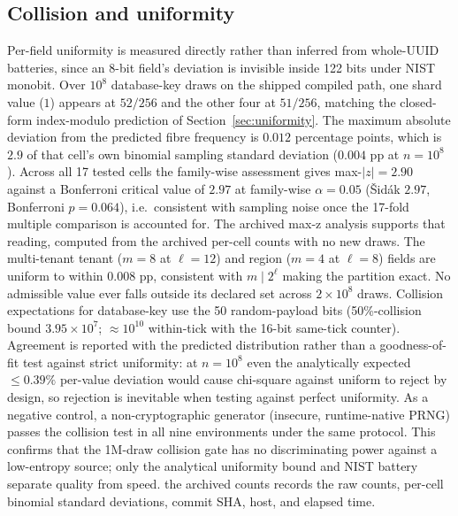 \documentclass{svproc}
\begin{document}
\subsection{Collision and uniformity}
Per-field uniformity is measured directly rather than inferred from whole-UUID batteries, since an 8-bit field's deviation is invisible inside 122 bits under NIST monobit. Over $10^8$ database-key draws on the shipped compiled path, one shard value ($1$) appears at $52/256$ and the other four at $51/256$, matching the closed-form index-modulo prediction of Section~\ref{sec:uniformity}. The maximum absolute deviation from the predicted fibre frequency is $0.012$ percentage points, which is $2.9$ of that cell's own binomial sampling standard deviation ($0.004$ pp at $n=10^8$). Across all 17 tested cells the family-wise assessment gives max-$|z|=2.90$ against a Bonferroni critical value of $2.97$ at family-wise $\alpha=0.05$ (\v{S}id\'ak $2.97$, Bonferroni $p=0.064$), i.e.\ consistent with sampling noise once the 17-fold multiple comparison is accounted for. The archived max-z analysis supports that reading, computed from the archived per-cell counts with no new draws. The multi-tenant tenant ($m=8$ at $\ell=12$) and region ($m=4$ at $\ell=8$) fields are uniform to within $0.008$ pp, consistent with $m \mid 2^{\ell}$ making the partition exact. No admissible value ever falls outside its declared set across $2\times10^8$ draws. Collision expectations for database-key use the 50 random-payload bits (50\%-collision bound $3.95\times10^7$; $\approx\!10^{10}$ within-tick with the 16-bit same-tick counter). Agreement is reported with the predicted distribution rather than a goodness-of-fit test against strict uniformity: at $n=10^8$ even the analytically expected $\leq 0.39\%$ per-value deviation would cause chi-square against uniform to reject by design, so rejection is inevitable when testing against perfect uniformity. As a negative control, a non-cryptographic generator (insecure, runtime-native PRNG) passes the collision test in all nine environments under the same protocol. This confirms that the 1M-draw collision gate has no discriminating power against a low-entropy source; only the analytical uniformity bound and NIST battery separate quality from speed. the archived counts records the raw counts, per-cell binomial standard deviations, commit SHA, host, and elapsed time.
\end{document}
